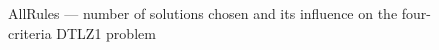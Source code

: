 \begin{figure}
  \centering
  \caption{AllRules --- number of solutions chosen and its influence on the
    four-criteria DTLZ1 problem}
  \label{dtlz1_c4_allrules}
\end{figure}

